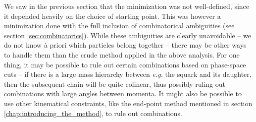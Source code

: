 \documentclass[twoside,english]{uiofysmaster}
\begin{document}

We saw in the previous section that the minimization was not well-defined, since it depended heavily on the choice of starting point. This was however a minimization done with the full inclusion of combinatorical ambiguities (see section \ref{sec:combinatorics}). While these ambiguities are clearly unavoidable -- we do not know \`{a} priori which particles belong together -- there may be other ways to handle them than the crude method applied in the above analysis. For one thing, it may be possible to rule out certain combinations based on phase-space cuts -- if there is a large mass hierarchy between {\it e.g.} the squark and its daughter, then the subsequent chain will be quite colinear, thus possibly ruling out combinations with large angles between momenta. It might also be possible to use other kinematical constraints, like the end-point method mentioned in section \ref{chap:introducing_the_method}, to rule out combinations. 


\end{document}
